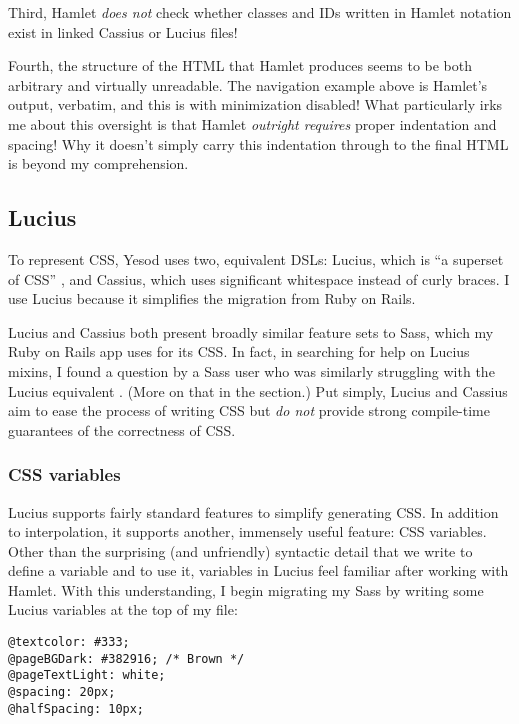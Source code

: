 Third, Hamlet \emph{does not} check whether classes and IDs written in Hamlet notation exist in linked Cassius or Lucius files!

Fourth, the structure of the HTML that Hamlet produces seems to be both arbitrary and virtually unreadable. The navigation example above is Hamlet's output, verbatim, and this is with minimization disabled! What particularly irks me about this oversight is that Hamlet \emph{outright requires} proper indentation and spacing! Why it doesn't simply carry this indentation through to the final HTML is beyond my comprehension.

\subsection{Lucius}
To represent CSS, Yesod uses two, equivalent DSLs: Lucius, which is ``a superset of CSS'' \cite{ybkShakes}, and Cassius, which uses significant whitespace instead of curly braces. I use Lucius because it simplifies the migration from Ruby on Rails.

Lucius and Cassius both present broadly similar feature sets to Sass, which my Ruby on Rails app uses for its CSS. In fact, in searching for help on Lucius mixins, I found a question by a Sass user who was similarly struggling with the Lucius equivalent \cite{soSass}. (More on that in the  section.) Put simply, Lucius and Cassius aim to ease the process of writing CSS but \emph{do not} provide strong compile-time guarantees of the correctness of CSS.

\subsubsection{CSS variables}

Lucius supports fairly standard features to simplify generating CSS. In addition to interpolation, it supports another, immensely useful feature: CSS variables. Other than the surprising (and unfriendly) syntactic detail that we write  to define a variable and  to use it, variables in Lucius feel familiar after working with Hamlet. With this understanding, I begin migrating my Sass by writing some Lucius variables at the top of my  file:

\begin{Verbatim}[samepage=true]
@textcolor: #333;
@pageBGDark: #382916; /* Brown */
@pageTextLight: white;
@spacing: 20px;
@halfSpacing: 10px;
\end{Verbatim}

